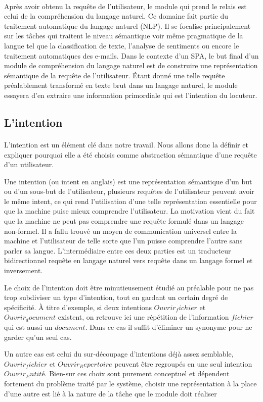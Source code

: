 	\paragraph{}
	\label{nlu_chap2}
	Après avoir obtenu la requête de l'utilisateur, le module qui prend le relais est celui de la compréhension du langage naturel. Ce domaine fait partie du traitement automatique du langage naturel (NLP). Il se focalise principalement sur les tâches qui traitent le niveau sémantique voir même pragmatique de la langue tel que la classification de texte, l'analyse de sentiments ou encore le traitement automatiques des e-mails. Dans le contexte d'un SPA, le but final d'un module de compréhension du langage naturel est de construire une représentation sémantique de la requête de l'utilisateur. Étant donné une telle requête préalablement transformé en texte brut dans un langage naturel, le module essayera d'en extraire une information primordiale qui est l'intention du locuteur.
	
	\subsection{L'intention}
	\paragraph{}
	L'intention est un élément clé dans notre travail. Nous allons donc la définir et expliquer pourquoi elle a été choisis comme abstraction sémantique d'une requête d'un utilisateur. \par
	
	Une intention (ou intent en anglais) est une représentation sémantique d'un but ou d'un sous-but de l'utilisateur, plusieurs requêtes de l'utilisateur peuvent avoir le même intent, ce qui rend l'utilisation d'une telle représentation essentielle pour que la machine puise mieux comprendre l'utilisateur. La motivation vient du fait que la machine ne peut pas comprendre une requête formulé dans un langage non-formel. Il a fallu trouvé un moyen de communication universel entre la machine et l'utilisateur de telle sorte que l'un puisse comprendre l'autre sans parler sa langue. L'intermédiaire entre ces deux parties est un traducteur bidirectionnel requête en langage naturel vers requête dans un langage formel et inversement. 
	\par Le choix de l'intention doit être minutieusement étudié au préalable pour ne pas trop subdiviser un type d'intention, tout en gardant un certain degré de spécificité. À titre d'exemple, si deux intentions $Ouvrir_fichier$ et $Ouvrir_document$ existent, on retrouve ici une répétition de l'information $fichier$ qui est aussi un $document$. Dans ce cas il suffit d'éliminer un synonyme pour ne garder qu'un seul cas. \par
	Un autre cas est celui du sur-découpage d'intentions déjà assez semblable, $Ouvrir_fichier$ et $Ouvrir_Repertoire$ peuvent être regroupés en une seul intention $Ouvrir_Entité$. Bien-sur ces choix sont purement conceptuel et dépendent fortement du problème traité par le système, choisir une représentation à la place d'une autre est lié à la nature de la tâche que le module doit réaliser \cite{intent_classification,intent_slots}
